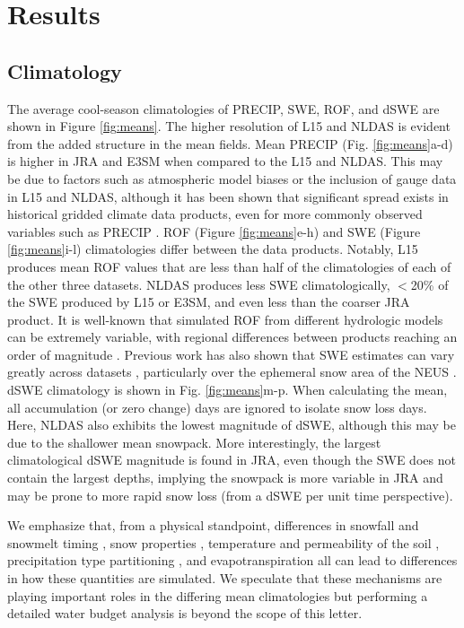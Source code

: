 \documentclass[draft]{agujournal2019}
\begin{document}
\section{Results}

\subsection{Climatology}

The average cool-season climatologies of PRECIP, SWE, ROF, and dSWE are shown in Figure \ref{fig:means}. 
The higher resolution of L15 and NLDAS is evident from the added structure in the mean fields. 
Mean PRECIP (Fig. \ref{fig:means}a-d) is higher in JRA and E3SM when compared to the L15 and NLDAS. 
This may be due to factors such as atmospheric model biases or the inclusion of gauge data in L15 and NLDAS, although it has been shown that significant spread exists in historical gridded climate data products, even for more commonly observed variables such as PRECIP \citep{gutmann2012comparison,livneh2014filling,henn2018an}.
ROF (Figure \ref{fig:means}e-h) and SWE (Figure \ref{fig:means}i-l) climatologies differ between the data products. 
Notably, L15 produces mean ROF values that are less than half of the climatologies of each of the other three datasets. 
NLDAS produces less SWE climatologically, $<$20\% of the SWE produced by L15 or E3SM, and even less than the coarser JRA product. 
It is well-known that simulated ROF from different hydrologic models can be extremely variable, with regional differences between products reaching an order of magnitude \citep{gudmundsson2012comparing,sood2015global,beck2017global}. 
Previous work has also shown that SWE estimates can vary greatly across datasets \citep{lundquist2015high,Rhoades2018a}, particularly over the ephemeral snow area of the NEUS \citep{mccrary2017evaluation,mccrary2022projections}. 
dSWE climatology is shown in Fig. \ref{fig:means}m-p.
When calculating the mean, all accumulation (or zero change) days are ignored to isolate snow loss days. 
Here, NLDAS also exhibits the lowest magnitude of dSWE, although this may be due to the shallower mean snowpack. 
More interestingly, the largest climatological dSWE magnitude is found in JRA, even though the SWE does not contain the largest depths, implying the snowpack is more variable in JRA and may be prone to more rapid snow loss (from a dSWE per unit time perspective).

We emphasize that, from a physical standpoint, differences in snowfall and snowmelt timing \citep{rauscher2008future,mccabe2005trends}, snow properties \citep{brown2006evaluation}, temperature and permeability of the soil \citep{niu2006effects}, precipitation type partitioning \citep{knowles2006trends}, and evapotranspiration \citep{zheng2019on} all can lead to differences in how these quantities are simulated. We speculate that these mechanisms are playing important roles in the differing mean climatologies but performing a detailed water budget analysis is beyond the scope of this letter.
\end{document}

